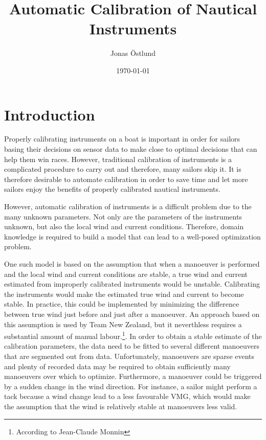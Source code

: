 \documentclass{article}
\author{Jonas Östlund}
\date{\today}
\title{Automatic Calibration of Nautical Instruments}
\begin{document}
\maketitle
\section{Introduction}
Properly calibrating instruments on a boat is important in order for sailors basing their decisions on sensor data to make close to optimal decisions that can help them win races. However, traditional calibration of instruments is a complicated procedure to carry out and therefore, many sailors skip it. It is therefore desirable to automate calibration in order to save time and let more sailors enjoy the benefits of properly calibrated nautical instruments.

However, automatic calibration of instruments is a difficult problem due to the many unknown parameters. Not only are the parameters of the instruments unknown, but also the local wind and current conditions. Therefore, domain knowledge is required to build a model that can lead to a well-posed optimization problem.

One such model is based on the assumption that when a manoeuver is performed and the local wind and current conditions are stable, a true wind and current estimated from improperly calibrated instruments would be unstable. Calibrating the instruments would make the estimated true wind and current to become stable. In practice, this could be implemented by minimizing the difference between true wind just before and just after a manoeuver. An approach based on this assumption is used by Team New Zealand, but it neverthless requires a substantial amount of manual labour.\footnote{According to Jean-Claude Monnin}. In order to obtain a stable estimate of the calibration parameters, the data need to be fitted to several different manoeuvers that are segmented out from data. Unfortunately, manoeuvers are sparse events and plenty of recorded data may be required to obtain sufficiently many manoeuvers over which to optimize. Furthermore, a manoeuver could be triggered by a sudden change in the wind direction. For instance, a sailor might perform a tack because a wind change lead to a less favourable VMG, which would make the assumption that the wind is relatively stable at manoeuvers less valid.
\end{document}
